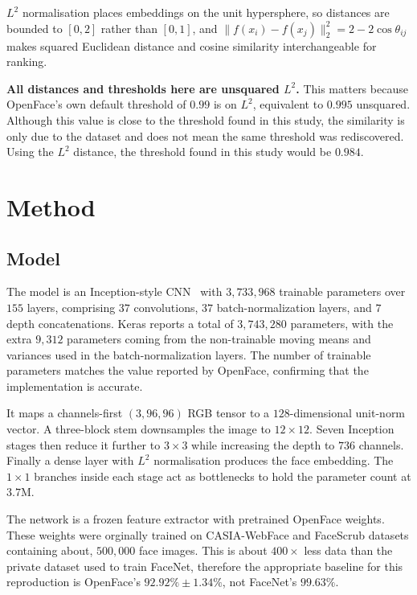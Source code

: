 \documentclass[conference]{IEEEtran}
\begin{document}
$L^2$ normalisation places embeddings on the unit hypersphere, so distances are
bounded to $[0,2]$ rather than $[0,1]$, and
$\lVert f(x_i)-f(x_j)\rVert_2^2 = 2-2\cos\theta_{ij}$ makes squared Euclidean
distance and cosine similarity interchangeable for ranking.

\textbf{All distances and thresholds here are unsquared $L^2$.} This matters
because OpenFace's own default threshold of $0.99$ is on $L^2$,
equivalent to $0.995$ unsquared. Although this value is close to the threshold found in this study, the similarity is only due to the dataset and does not mean the same threshold was rediscovered. Using the $L^2$ distance, the threshold found in this study would be $0.984$.

\section{Method}

\subsection{Model}

The model is an Inception-style CNN~\cite{szegedy2015going} with $3{,}733{,}968$
trainable parameters over $155$ layers, comprising $37$ convolutions, $37$
batch-normalization layers, and $7$ depth concatenations. Keras reports a total of $3{,}743{,}280$ parameters, with the extra $9{,}312$ parameters coming from the non-trainable moving means and variances used in the batch-normalization layers. The number of trainable parameters matches the value reported by OpenFace, confirming that the implementation is accurate.

It maps a channels-first $(3,96,96)$ RGB tensor to a $128$-dimensional unit-norm
vector. A three-block stem downsamples the image to $12\times12$. Seven Inception stages then
reduce it further to $3\times3$ while increasing the  depth to $736$ channels. Finally a dense layer with $L^2$ normalisation produces the face embedding. The $1\times1$ branches inside
each stage act as bottlenecks to hold the parameter count at $3.7$M.

The network is a frozen feature extractor with pretrained OpenFace weights. These weights were orginally trained on CASIA-WebFace and FaceScrub datasets containing about, $500{,}000$ face images. This is about $400\times$ less data than the private dataset used to train FaceNet, therefore the appropriate baseline for this reproduction is OpenFace's $92.92\% \pm 1.34\%$, not FaceNet's $99.63\%$.
\end{document}
